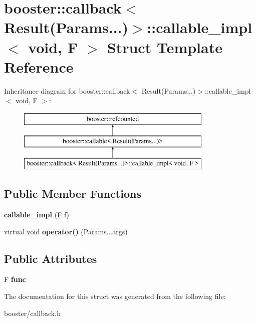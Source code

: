 \section{booster\+:\+:callback$<$ Result(Params...)$>$\+:\+:callable\+\_\+impl$<$ void, F $>$ Struct Template Reference}
\label{structbooster_1_1callback_3_01Result_07Params_8_8_8_08_4_1_1callable__impl_3_01void_00_01F_01_4}
Inheritance diagram for booster\+:\+:callback$<$ Result(Params...)$>$\+:\+:callable\+\_\+impl$<$ void, F $>$\+:\begin{figure}[H]
\begin{center}
\leavevmode
\includegraphics[height=3.000000cm]{structbooster_1_1callback_3_01Result_07Params_8_8_8_08_4_1_1callable__impl_3_01void_00_01F_01_4}
\end{center}
\end{figure}
\subsection*{Public Member Functions}
\begin{DoxyCompactItemize}
\item 
{\bfseries callable\+\_\+impl} (F f)\label{structbooster_1_1callback_3_01Result_07Params_8_8_8_08_4_1_1callable__impl_3_01void_00_01F_01_4_ab8647f4dfe07d3138926628ecd951f47}

\item 
virtual void {\bfseries operator()} (Params...\+args)\label{structbooster_1_1callback_3_01Result_07Params_8_8_8_08_4_1_1callable__impl_3_01void_00_01F_01_4_acf622b8a698f9ac9bdfd193f32f5e107}

\end{DoxyCompactItemize}
\subsection*{Public Attributes}
\begin{DoxyCompactItemize}
\item 
F {\bfseries func}\label{structbooster_1_1callback_3_01Result_07Params_8_8_8_08_4_1_1callable__impl_3_01void_00_01F_01_4_a1d9256439f3c5579ec5e379c81321e4b}

\end{DoxyCompactItemize}


The documentation for this struct was generated from the following file\+:\begin{DoxyCompactItemize}
\item 
booster/callback.\+h\end{DoxyCompactItemize}
